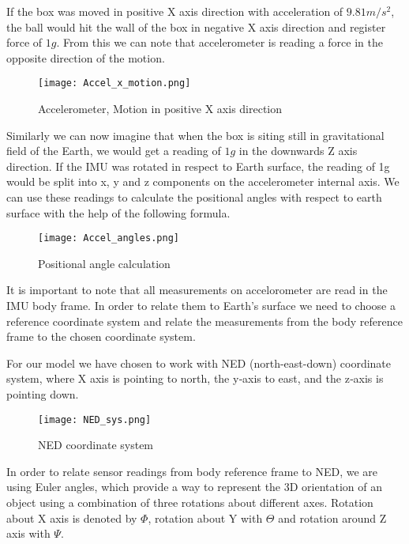\documentclass{article}
\begin{document}
If the box was moved in positive X axis direction with acceleration of $9.81 m/s^2$, the ball would hit the wall of the box in negative X axis direction and register force of $1g$. From this we can note that accelerometer is reading a force in the opposite direction of the motion. 

\begin{figure}[H]
    \begin{center}
    \texttt{[image: Accel\_x\_motion.png]}
    \end{center}
    \caption{Accelerometer, Motion in positive X axis direction}
    \label{fig:my_label}
\end{figure}

Similarly we can now imagine that when the box is siting still in gravitational field of the Earth, we would get a reading of $1g$ in the downwards Z axis direction. If the IMU was rotated in respect to Earth surface, the reading of 1g would be split into x, y and z components on the accelerometer internal axis. We can use these readings to calculate the positional angles with respect to earth surface with the help of the following formula.

\begin{figure}[H]
    \begin{center}
    \texttt{[image: Accel\_angles.png]}
    \end{center}
    \caption{Positional angle calculation   }
    \label{fig:my_label}
\end{figure}

It is important to note that all measurements on accelorometer are read in the IMU body frame. In order to relate them to Earth's surface we need to choose a reference coordinate system and relate the measurements from the body reference frame to the chosen coordinate system.

For our model we have chosen to work with NED (north-east-down) coordinate system, where X axis is pointing to north, the y‐axis to east, and the z‐axis is pointing down.

\begin{figure}[H]
    \begin{center}
    \texttt{[image: NED\_sys.png]}
    \end{center}
    \caption{NED coordinate system}
    \label{fig:my_label}
\end{figure}

In order to relate sensor readings from body reference frame to NED, we are using Euler angles, which provide a way to represent the 3D orientation of an object using a combination of three rotations about different axes. Rotation about X axis is denoted by $\Phi$, rotation about Y with $\Theta$ and rotation around Z axis with $\Psi$. 
\end{document}
